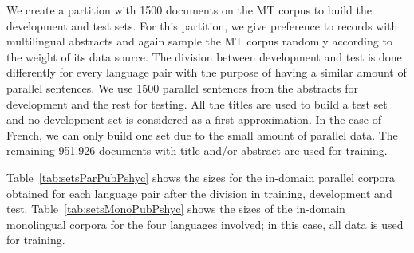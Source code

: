 \documentclass[a4paper,11pt]{article}
\begin{document}
We create a partition with 1500 documents on the MT corpus to build the development and test sets. For this partition, we give preference to
records with multilingual abstracts and again sample the MT corpus randomly according to the weight of its data source. The division between development and test is done differently for every language pair with the purpose of having a similar amount of parallel sentences. We use 1500 parallel sentences from the abstracts for development and the rest for testing. All the titles are used to build a test set and no development set is considered as a first approximation. In the case of French, we can only build one set due to the small amount of parallel data. The remaining 951.926 documents with title and/or abstract are used for training.

Table~\ref{tab:setsParPubPshyc} shows the sizes for the in-domain parallel corpora obtained for each language pair after the division in training, development and test. Table~\ref{tab:setsMonoPubPshyc} shows the sizes of the in-domain monolingual corpora for the four languages involved; in this case, all data is used for training.
\end{document}
